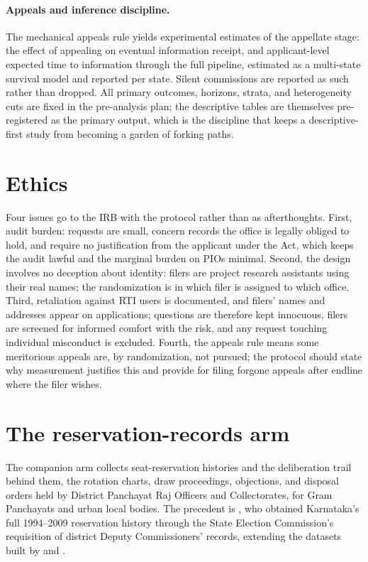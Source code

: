 \documentclass[11pt]{article}
\begin{document}
\paragraph{Appeals and inference discipline.} The mechanical appeals rule yields experimental estimates of the appellate stage: the effect of appealing on eventual information receipt, and applicant-level expected time to information through the full pipeline, estimated as a multi-state survival model and reported per state. Silent commissions are reported as such rather than dropped. All primary outcomes, horizons, strata, and heterogeneity cuts are fixed in the pre-analysis plan; the descriptive tables are themselves pre-registered as the primary output, which is the discipline that keeps a descriptive-first study from becoming a garden of forking paths.

\section{Ethics}
\label{sec:ethics}

Four issues go to the IRB with the protocol rather than as afterthoughts. First, audit burden: requests are small, concern records the office is legally obliged to hold, and require no justification from the applicant under the Act, which keeps the audit lawful and the marginal burden on PIOs minimal. Second, the design involves no deception about identity: filers are project research assistants using their real names; the randomization is in which filer is assigned to which office. Third, retaliation against RTI users is documented, and filers' names and addresses appear on applications; questions are therefore kept innocuous, filers are screened for informed comfort with the risk, and any request touching individual misconduct is excluded. Fourth, the appeals rule means some meritorious appeals are, by randomization, not pursued; the protocol should state why measurement justifies this and provide for filing forgone appeals after endline where the filer wishes.

\section{The reservation-records arm}
\label{sec:reservation}

The companion arm collects seat-reservation histories and the deliberation trail behind them, the rotation charts, draw proceedings, objections, and disposal orders held by District Panchayat Raj Officers and Collectorates, for Gram Panchayats and urban local bodies. The precedent is \citet{dunning2013}, who obtained Karnataka's full 1994--2009 reservation history through the State Election Commission's requisition of district Deputy Commissioners' records, extending the datasets built by \citet{chattopadhyay2004} and \citet{besley2004}.
\end{document}
